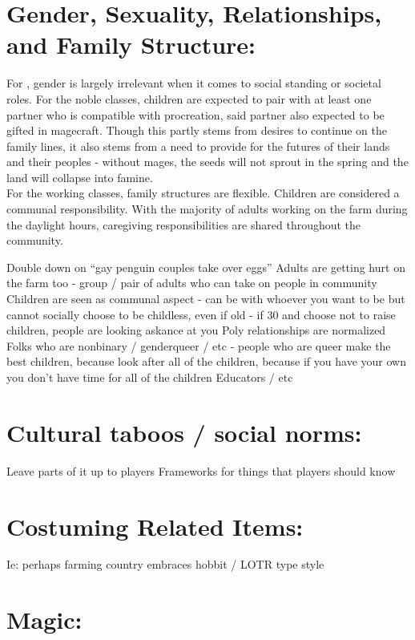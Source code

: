 \documentclass[blue]{GL2020}
\begin{document}
\section{Gender, Sexuality, Relationships, and Family Structure:}

For \pSunCh{}, gender is largely irrelevant when it comes to social standing or societal roles.  For the noble classes, children are expected to pair with at least one partner who is compatible with procreation, said partner also expected to be gifted in magecraft.  Though this partly stems from desires to continue on the family lines, it also stems from a need to provide for the futures of their lands and their peoples - without mages, the seeds will not sprout in the spring and the land will collapse into famine.  \\

For the working classes, family structures are flexible.  Children are considered a communal responsibility.  With the majority of adults working on the farm during the daylight hours, caregiving responsibilities are shared throughout the community.     



Double down on “gay penguin couples take over eggs”
Adults are getting hurt on the farm too - group / pair of adults who can take on people in community
Children are seen as communal aspect - can be with whoever you want to be but cannot socially choose to be childless, even if old - if 30 and choose not to raise children, people are looking askance at you
Poly relationships are normalized
Folks who are nonbinary / genderqueer / etc - people who are queer make the best children, because look after all of the children, because if you have your own you don’t have time for all of the children
Educators / etc

\section{Cultural taboos / social norms:}

Leave parts of it up to players
Frameworks for things that players should know

\section{Costuming Related Items:}

Ie: perhaps farming country embraces hobbit / LOTR type style

\section{Magic:}
\end{document}
